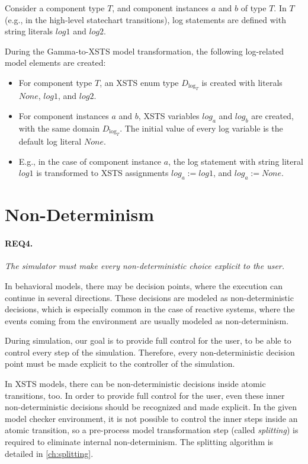 \begin{example}
    Consider a component type $T$, and component instances $a$ and $b$ of type $T$. In $T$ (e.g., in the high-level statechart transitions), log statements are defined with string literals $\mathit{log1}$ and $\mathit{log2}$.

    During the Gamma-to-XSTS model transformation, the following log-related model elements are created:
    \begin{itemize}
        \item For component type $T$, an XSTS enum type $D_{\mathrm{log}_T}$ is created with literals $\mathit{None}$, $\mathit{log1}$, and $\mathit{log2}$.
        \item For component instances $a$ and $b$, XSTS variables $\mathit{log}_a$ and $\mathit{log}_b$ are created, with the same domain $D_{\mathrm{log}_T}$. The initial value of every log variable is the default log literal $\mathit{None}$.
        \item E.g., in the case of component instance $a$, the log statement with string literal $\mathit{log1}$ is transformed to XSTS assignments $\mathit{log}_a := \mathit{log1}$, and $\mathit{log}_a := \mathit{None}$.
    \end{itemize}
\end{example}

\section{Non-Determinism}\label{sec:req-nondet}

\paragraph{REQ4.} \textit{The simulator must make every non-deterministic choice explicit to the user.}

In behavioral models, there may be decision points, where the execution can continue in several directions. These decisions are modeled as non-deterministic decisions, which is especially common in the case of reactive systems, where the events coming from the environment are usually modeled as non-determinism.

During simulation, our goal is to provide full control for the user, to be able to control every step of the simulation. Therefore, every non-deterministic decision point must be made explicit to the controller of the simulation.

In XSTS models, there can be non-deterministic decisions inside atomic transitions, too. In order to provide full control for the user, even these inner non-deterministic decisions should be recognized and made explicit. In the given model checker environment, it is not possible to control the inner steps inside an atomic transition, so a pre-process model transformation step (called \textit{splitting}) is required to eliminate internal non-determinism. The splitting algorithm is detailed in \autoref{ch:splitting}.

